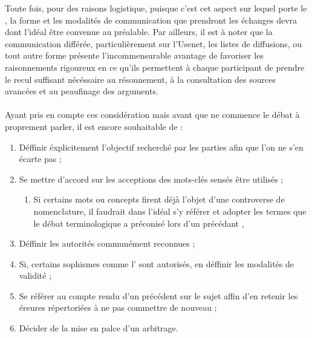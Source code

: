 Toute fois, pour des raisons logistique, puisque c’est cet aspect sur lequel porte le \mainabbr{}, la forme et les modalités de communication que prendront les échanges devra dont l’idéal être convenue au préalable. Par ailleurs, il est à noter que la communication différée, particulièrement sur l’Usenet, les listes de diffusions, ou tout autre forme présente l’incommensurable avantage de favoriser les raisonnements rigoureux en ce qu’ils permettent à chaque participant de prendre le recul suffisant nécéssaire au résonnement, à la consultation des sources avancées et au peaufinage des arguments.

\paragraph{}
Ayant pris en compte ces considération mais avant que ne commence le débat à proprement parler, il est encore souhaitable de :

\begin{enumerate}
  \item Déffinir éxplicitement l’objectif recherché par les parties afin que l’on ne s’en écarte pas ;

  \item Se mettre d’accord sur les acceptions des mots-clés sensés être utilisés ;

  \begin{enumerate}
    \item Si certains mots ou concepts firent déjà l’objet d’une controverse de nomenclature, il faudrait dans l’idéal s’y référer et adopter les termes que le débat terminologique a préconisé lors d’un précédant \mainabbr{},
  \end{enumerate}

  \item Déffinir les autorités communément reconnues ;

  \item Si, certains sophismes comme l’ sont autorisés, en déffinir les modalités de validité ;

  \item Se référer au compte rendu d’un précédent \mainabbr{} sur le sujet affin d’en retenir les éreures répertoriées à ne pas commettre de nouveau ;

  \item Décider de la mise en palce d’un arbitrage.

\end{enumerate}

